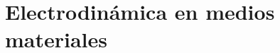 \documentclass[../main.tex]{subfiles}
\begin{document}
\chapter{Electrodinámica en medios materiales}

\end{document}
